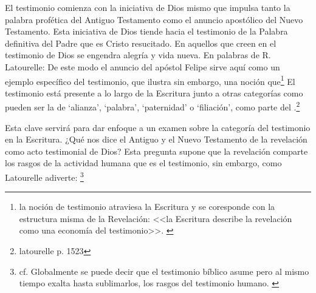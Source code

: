 El testimonio comienza con la iniciativa de Dios mismo que impulsa tanto la
palabra profética del Antiguo Testamento como el anuncio apostólico del Nuevo
Testamento. Esta iniciativa de Dios tiende hacia el testimonio de la Palabra
definitiva del Padre que es Cristo resucitado. En aquellos que creen en el
testimonio de Dios se engendra alegría y vida nueva. En palabras de R.
Latourelle:
De este modo el anuncio del apóstol Felipe sirve aquí como un ejemplo específico
del testimonio, que ilustra sin embargo, una noción
que\footnote{la noción de testimonio atraviesa
  la Escritura y se coresponde con la estructura misma de la Revelación: <<la
  Escritura describe la revelación como una economía del testimonio>>.
  \autocite[109]{prades2015testimonio}} El testimonio está presente a lo largo
de la Escritura junto a otras categorías como pueden ser la de `alianza',
`palabra', `paternidad' o `filiación', como parte del .\footnote{latourelle p. 1523}

Esta clave servirá para dar enfoque a un examen sobre la categoría del
testimonio en la Escritura. ¿Qué nos dice el Antiguo y el Nuevo Testamento de la
revelación como acto testimonial de Dios? Esta pregunta supone que la revelación
comparte los rasgos de la actividad humana que es el testimonio, sin embargo,
como Latourelle adiverte: \footnote{cf. Globalmente se
  puede decir que el testimonio bíblico asume pero al mismo tiempo exalta hasta
  sublimarlos, los rasgos del testimonio humano. \autocite[1526]{latourelle2000testimonio}}

